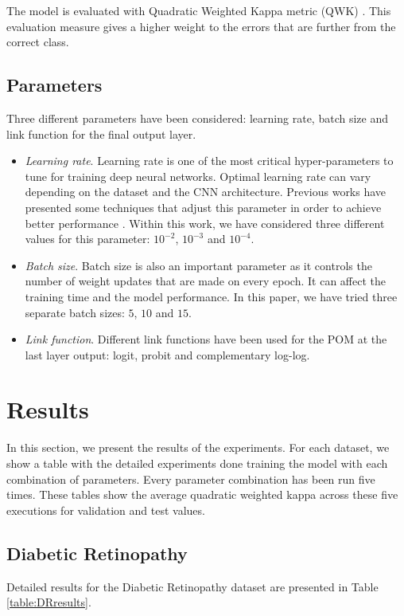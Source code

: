 \documentclass[10pt, a4paper, titlepage]{article}
\begin{document}
\begin{multicols}{2}
	The model is evaluated with Quadratic Weighted Kappa metric (QWK) \cite{ben2008comparison}. This evaluation measure gives a higher weight to the errors that are further from the correct class.
	
	\subsection{Parameters}
	Three different parameters have been considered: learning rate, batch size and link function for the final output layer.
	
	\begin{itemize}
		\item \textit{Learning rate}. Learning rate is one of the most critical hyper-parameters to tune for training deep neural networks. Optimal learning rate can vary depending on the dataset and the CNN architecture. Previous works have presented some techniques that adjust this parameter in order to achieve better performance \cite{smith2017cyclical}\cite{senior2013empirical}. Within this work, we have considered three different values for this parameter: $10^{-2}$, $10^{-3}$ and $10^{-4}$.
		\item \textit{Batch size}. Batch size is also an important parameter as it controls the number of weight updates that are made on every epoch. It can affect the training time and the model performance. In this paper, we have tried three separate batch sizes: $5$, $10$ and $15$.
		\item \textit{Link function}. Different link functions have been used for the POM at the last layer output: logit, probit and complementary log-log.
	\end{itemize}
	
	\section{Results}
	In this section, we present the results of the experiments. For each dataset, we show a table with the detailed experiments done training the model with each combination of parameters. Every parameter combination has been run five times. These tables show the average quadratic weighted kappa across these five executions for validation and test values.
	
	\subsection{Diabetic Retinopathy}
	Detailed results for the Diabetic Retinopathy dataset are presented in Table \ref{table:DRresults}.
	

\end{multicols}
\end{document}
